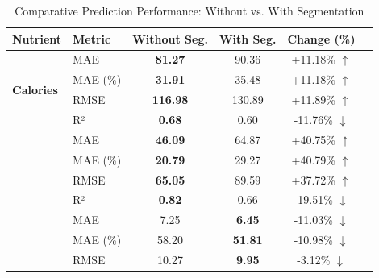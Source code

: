 \documentclass[a4paper]{article}
\begin{document}
        \begin{table}[H]
            \centering
            \caption{Comparative Prediction Performance: Without vs. With Segmentation}
            \label{tab:comparison}
            
            \begin{lrbox}{\mycomparisonboxtable}
            \begin{tabular}{@{}llcccc@{}}
            \toprule
            \textbf{Nutrient} & \textbf{Metric} & \textbf{Without Seg.} & \textbf{With Seg.} & \textbf{Change (\%)} \\
            \midrule
            \multirow{4}{*}{\textbf{Calories}} 
            & MAE       & \textbf{81.27}  & 90.36  & \textcolor{badred}{+11.18\% $\uparrow$} \\
            & MAE (\%)  & \textbf{31.91}  & 35.48  & \textcolor{badred}{+11.18\% $\uparrow$} \\
            & RMSE      & \textbf{116.98} & 130.89 & \textcolor{badred}{+11.89\% $\uparrow$} \\
            & R²        & \textbf{0.68}   & 0.60   & \textcolor{badred}{-11.76\% $\downarrow$} \\
            \addlinespace %
            \multirow{4}{*}{\textbf{Weight}}   
            & MAE       & \textbf{46.09}  & 64.87  & \textcolor{badred}{+40.75\% $\uparrow$} \\
            & MAE (\%)  & \textbf{20.79}  & 29.27  & \textcolor{badred}{+40.79\% $\uparrow$} \\
            & RMSE      & \textbf{65.05}  & 89.59  & \textcolor{badred}{+37.72\% $\uparrow$} \\
            & R²        & \textbf{0.82}   & 0.66   & \textcolor{badred}{-19.51\% $\downarrow$} \\
            \addlinespace
            \multirow{4}{*}{\textbf{Fat}}      
            & MAE       & 7.25   & \textbf{6.45}   & \textcolor{goodgreen}{-11.03\% $\downarrow$} \\
            & MAE (\%)  & 58.20  & \textbf{51.81}  & \textcolor{goodgreen}{-10.98\% $\downarrow$} \\
            & RMSE      & 10.27  & \textbf{9.95}   & \textcolor{goodgreen}{-3.12\% $\downarrow$} \\

\end{tabular}
\end{lrbox}
\end{table}
\end{document}
